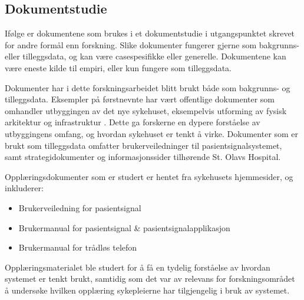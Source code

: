 \subsection{Dokumentstudie}
\label{sec:dokumentstudie}
Ifølge \citet{Tjora} er dokumentene som brukes i et dokumentstudie i utgangspunktet skrevet for andre formål enn forskning. Slike dokumenter fungerer gjerne som bakgrunns- eller tilleggsdata, og kan være casespesifikke eller generelle. Dokumentene kan være eneste kilde til empiri, eller kun fungere som tilleggsdata. 

\noindent
Dokumenter har i dette forskningsarbeidet blitt brukt både som bakgrunns- og tilleggsdata. Eksempler på førstnevnte har vært offentlige dokumenter som omhandler utbyggingen av det nye sykehuset, eksempelvis utforming av fysisk arkitektur \citep{Aslaksen, Sintef-sengetun} og infrastruktur \citep{TU}. Dette ga forskerne en dypere forståelse av utbyggingens omfang, og hvordan sykehuset er tenkt å virke. Dokumenter som er brukt som tilleggsdata omfatter brukerveiledninger til pasientsignalsystemet, samt strategidokumenter og informasjonssider tilhørende St. Olavs Hospital. 

\noindent
Opplæringsdokumenter som er studert er hentet fra sykehusets hjemmesider, og inkluderer:
\begin{itemize}
\item Brukerveiledning for pasientsignal \citep{BrukerveiledningforPasientsignal}
\item Brukermanual for pasientsignal \& pasientsignalapplikasjon \citep{BrukermanualforPasientsignalogPasientsignalapplikasjon}
\item Brukermanual for trådløs telefon \citep{BrukerveiledningforTradlostelefon}
\end{itemize}

\noindent
Opplæringsmaterialet ble studert for å få en tydelig forståelse av hvordan systemet er tenkt brukt, samtidig som det var av relevans for forskningsområdet å undersøke hvilken opplæring sykepleierne har tilgjengelig i bruk av systemet.
